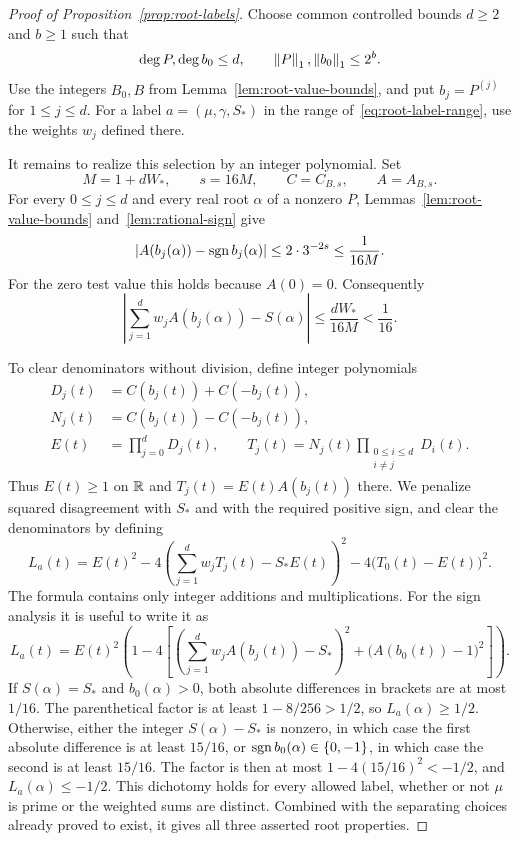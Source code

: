 \begin{proof}[Proof of Proposition~\ref{prop:root-labels}]
Choose common controlled bounds $d\ge2$ and $b\ge1$ such that
\[
 \deg P,\deg b_0\le d,\qquad
 \left\lVert P\right\rVert_1,\left\lVert b_0\right\rVert_1\le2^b.
\]
Use the integers $B_0,B$ from Lemma~\ref{lem:root-value-bounds}, and put
$b_j=P^{(j)}$ for $1\le j\le d$.  For a label $a=(\mu,\gamma,S_*)$ in the range
of~\eqref{eq:root-label-range}, use the weights $w_j$ defined there.

It remains to realize this selection by an integer polynomial.  Set
\[
             M=1+dW_*,\qquad s=16M,
             \qquad C=C_{B,s},\qquad A=A_{B,s}.
\]
For every $0\le j\le d$ and every real root $\alpha$ of a nonzero $P$,
Lemmas~\ref{lem:root-value-bounds} and~\ref{lem:rational-sign} give
\begin{equation}\label{eq:root-sign-error}
        |A(b_j(\alpha))-\operatorname{sgn} b_j(\alpha)|
            \le2\cdot3^{-2s}\le\frac1{16M}.
\end{equation}
For the zero test value this holds because $A(0)=0$.
Consequently
\begin{equation}\label{eq:weighted-sign-error}
 \left|\sum_{j=1}^d w_j A(b_j(\alpha))-S(\alpha)\right|
                \le\frac{dW_*}{16M}<\frac1{16}.
\end{equation}

To clear denominators without division, define integer polynomials
\begin{align*}
 D_j(t)&=C(b_j(t))+C(-b_j(t)),\\
 N_j(t)&=C(b_j(t))-C(-b_j(t)),\\
 E(t)&=\prod_{j=0}^d D_j(t),\qquad
 T_j(t)=N_j(t)\prod_{\substack{0\le i\le d\\i\ne j}}D_i(t).
\end{align*}
Thus $E(t)\ge1$ on $\mathbb R$ and $T_j(t)=E(t)A(b_j(t))$ there.
We penalize squared disagreement with $S_*$ and with the required
positive sign, and clear the denominators by defining
\begin{equation}\label{eq:root-label-polynomial}
 L_a(t)=E(t)^2
       -4\left(\sum_{j=1}^d w_jT_j(t)-S_*E(t)\right)^2
       -4\bigl(T_0(t)-E(t)\bigr)^2.
\end{equation}
The formula contains only integer additions and multiplications.
For the sign analysis it is useful to write it as
\[
 L_a(t)=E(t)^2\left(1-4\left[
    \left(\sum_{j=1}^d w_j A(b_j(t))-S_*\right)^2
       +\bigl(A(b_0(t))-1\bigr)^2\right]\right).
\]
If $S(\alpha)=S_*$ and $b_0(\alpha)>0$, both absolute differences in
brackets are at most $1/16$.  The parenthetical factor is at least
$1-8/256>1/2$, so $L_a(\alpha)\ge1/2$.
Otherwise, either the integer $S(\alpha)-S_*$ is nonzero, in which
case the first absolute difference is at least $15/16$, or
$\operatorname{sgn} b_0(\alpha)\in\{0,-1\}$, in which case the second is at least
$15/16$.  The factor is then at most $1-4(15/16)^2<-1/2$,
and $L_a(\alpha)\le-1/2$.  This dichotomy holds for every allowed
label, whether or not $\mu$ is prime or the weighted sums are distinct.
Combined with the separating choices already proved to exist, it gives
all three asserted root properties.


\end{proof}
